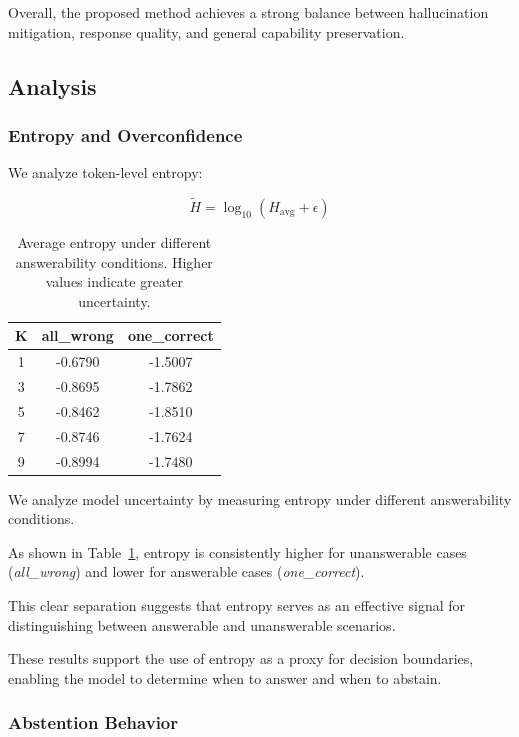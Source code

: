 Overall, the proposed method achieves a strong balance between hallucination mitigation, response quality, and general capability preservation.


\subsection{Analysis}

\subsubsection{Entropy and Overconfidence}

We analyze token-level entropy:

\[
\tilde{H} = \log_{10}(H_{\text{avg}} + \epsilon)
\]

\begin{table}[h]
\centering
\caption{Average entropy under different answerability conditions. Higher values indicate greater uncertainty.}
\label{tab:entropy}
\begin{tabular}{ccc}
\toprule
K & all\_wrong & one\_correct \\
\midrule
1 & -0.6790 & -1.5007 \\
3 & -0.8695 & -1.7862 \\
5 & -0.8462 & -1.8510 \\
7 & -0.8746 & -1.7624 \\
9 & -0.8994 & -1.7480 \\
\bottomrule
\end{tabular}
\end{table}

We analyze model uncertainty by measuring entropy under different answerability conditions.

As shown in Table~\ref{tab:entropy}, entropy is consistently higher for unanswerable cases (\textit{all\_wrong}) and lower for answerable cases (\textit{one\_correct}).

This clear separation suggests that entropy serves as an effective signal for distinguishing between answerable and unanswerable scenarios.

These results support the use of entropy as a proxy for decision boundaries, enabling the model to determine when to answer and when to abstain.

\subsubsection{Abstention Behavior}

